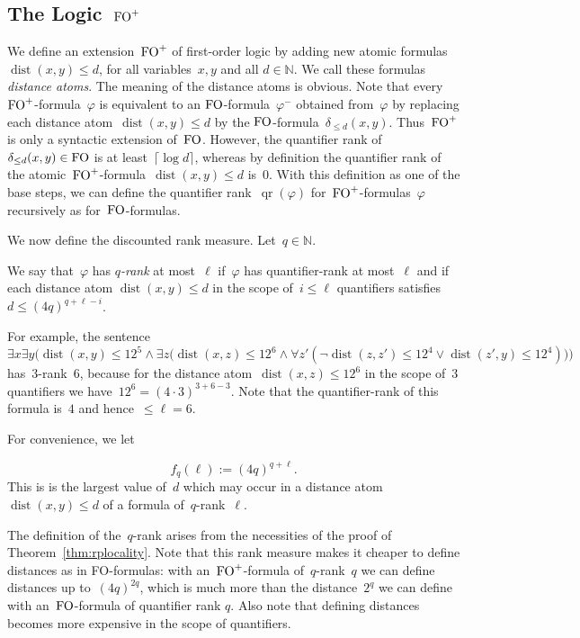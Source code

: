 \documentclass[11pt]{article}
\numberwithin{equation}{section}
\newcommand{\N}{{\mathbb N}} \newcommand{\Q}{{\mathbb Q}}
\newcommand{\FO}{\textup{FO}}
\newcommand{\dist}{\operatorname{dist}}
\renewcommand{\phi}{\varphi}
\newcommand{\qr}{\operatorname{qr}}
\begin{document}
\subsection{The Logic~$\FO^+$}
We define an extension~$\FO^+$ of first-order logic by adding new
atomic formulas~$\dist(x,y)\le d$, for all variables~$x,y$ and all
$d\in\mathbb N$. We call these formulas \emph{distance atoms}. The
meaning of the distance atoms is
obvious. Note that every~$\FO^+$-formula~$\phi$ is equivalent to an
$\FO$-formula~$\phi^-$ obtained from~$\phi$ by replacing each distance
atom~$\dist(x,y)\le d$ by the
$\FO$-formula~$\delta_{\le d}(x,y)$. Thus~$\FO^+$ is only a syntactic
extension of~$\FO$. However, the quantifier rank of~$\delta_{\le
  d}(x,y)\in\FO$ is at least~$\lceil\log d\rceil$, whereas by
definition the
quantifier rank of the atomic~$\FO^+$-formula~$\dist(x,y)\le d$ is~$0$.
With this definition as one of the base steps, we can define the
quantifier rank~$\qr(\phi)$ for~$\FO^+$-formulas~$\phi$ recursively
as for~$\FO$-formulas.

We now define the discounted rank measure. Let~$q\in\N$. 

We say that~$\phi$ has \emph{$q$-rank} at most~$\ell$ if~$\phi$ has
quantifier-rank at most~$\ell$ and if each distance atom
$\dist(x,y)\leq d$ in the scope of~$i\leq \ell$ quantifiers satisfies
$d\leq (4q)^{q+\ell-i}$.

For example, the sentence 
\[
\exists x\exists y\Big(\dist(x,y)\le 12^5\wedge\exists
z\big(\dist(x,z)\le 12^6\wedge\forall
z'(\neg\dist(z,z')\le 12^4\vee\dist(z',y)\le 12^4)\big)\Big)
\]
has~$3$-rank~$6$, because for the distance atom~$\dist(x,z)\le 12^6$
in the scope of~$3$ quantifiers we have~$12^6=(4\cdot
3)^{3+6-3}$. Note that the quantifier-rank of this formula is~$4$ and
hence~$\leq\ell=6$.

For convenience, we let 

\begin{equation}
  f_q(\ell):=(4q)^{q+\ell}.\label{eq:f}
\end{equation}
This is is the
largest value of~$d$ which may occur in a distance atom~$\dist(x,y)\le
d$ of a formula of~$q$-rank~$\ell$.


The definition of the~$q$-rank
arises from the necessities of the proof of
Theorem~\ref{thm:rplocality}. Note that this rank measure makes it
cheaper to define distances as in \FO-formulas: with an~$\FO^+$-formula of~$q$-rank~$q$
we can define distances up to~$(4q)^{2q}$, which is much more than the
distance~$2^q$ we can define with an~$\FO$-formula of quantifier rank
$q$. Also note that defining distances becomes more expensive in the
scope of quantifiers.
\end{document}
